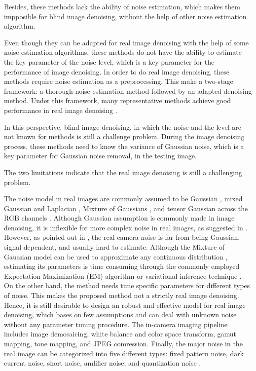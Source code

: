 \documentclass[10pt,twocolumn,letterpaper]{article}
\begin{document}
Besides, these methods lack the ability of noise estimation, which makes them impposible for blind image denoising, without the help of other noise estimation algorithm. 



Even though they can be adapted for real image denoising with the help of some noise estimation algorithms, these methods do not have the ability to estimate the key parameter of the noise level, which is a key parameter for the performance of image denoising. In order to do real image denoising, these methods require noise estimation as a preprocessing. This make a two-stage framework: a thorough noise estimation method followed by an adapted denoising method. Under this framework, many representative methods achieve good performance in real image denoising \cite{fullyblind,rabie2005robust,Liu2008,almapg,noiseclinic,Zhu_2016_CVPR,crosschannel2016}.


In this perspective, blind image denoising, in which the noise and the level are not known for methods is still a challenge problem.
During the image denoising process, these methods need to know the variance of Gaussian noise, which is a key parameter for Gaussian noise removal, in the testing image.

The two limitations indicate that the real image denoising is still a challenging problem. 

The noise model in real images are commonly assumed to be Gaussian \cite{fullyblind,rabie2005robust,Liu2008}, mixed Gaussian and Laplacian \cite{almapg}, Mixture of Gaussians \cite{noiseclinic,Zhu_2016_CVPR}, and tensor Gaussian across the RGB channels \cite{crosschannel2016}. Although Gaussian assumption is commonly made in image denoising, it is inflexible for more complex noise in real images, as suggested in \cite{Liu2008,noiseclinic}. However, as pointed out in \cite{crosschannel2016}, the real camera noise is far from being Gaussian, signal dependent, and usually hard to estimate. Although the Mixture of Gaussian model can be used to approximate any continuous distribution \cite{Bishop}, estimating its parameters is time consuming through the commonly employed Expectation-Maximization (EM) algorithm \cite{em} or variational inference technique \cite{Bishop}. On the other hand, the method \cite{almapg} needs tune specific parameters for different types of noise. This makes the proposed method not a strictly real image denoising. Hence, it is still desirable to design an robust and effective model for real image denoising, which bases on few assumptions and can deal with unknown noise without any parameter tuning procedure. The in-camera imaging pipeline includes image demosaicing, white balance and color space transform, gamut mapping, tone mapping, and JPEG comression. Finally, the major noise in the real image can be categorized into five different types: fixed pattern noise, dark current noise, short noise, amlifier noise, and quantization noise \cite{tsin2001statistical}.
\end{document}
